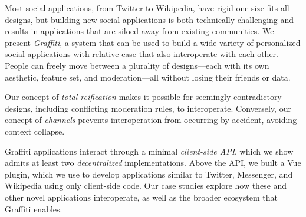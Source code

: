 
Most social applications, from Twitter to Wikipedia,
have rigid one-size-fits-all designs, but building new social applications
is both technically challenging and results in
applications that are siloed away from existing communities.
We present \emph{Graffiti}, a system that can be used
to build a wide variety of personalized social applications
with relative ease that also interoperate with each other. People can freely move between
a plurality of designs---each with its own aesthetic, feature set,
and moderation---all without losing their friends or data.

Our concept of \emph{total reification} makes it possible
for seemingly contradictory designs, including conflicting
moderation rules, to interoperate.
Conversely, our concept of \emph{channels}
prevents interoperation from occurring by accident, avoiding context collapse.

Graffiti applications interact through a minimal \emph{client-side API},
which we show admits at least two \emph{decentralized} implementations.
Above the API, we built a Vue plugin, which we use to
develop applications similar to Twitter, Messenger, and Wikipedia
using only client-side code.
Our case studies explore how these and other novel applications interoperate,
as well as the broader ecosystem that Graffiti enables.
